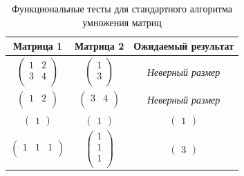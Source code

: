 \begin{table}[h!]
    \caption{Функциональные тесты для стандартного алгоритма умножения матриц}
    \label{tbl:func_test_std}
    \centering
        \begin{tabular}{||c|c|c||} 
        \hline
        Матрица 1& Матрица 2& Ожидаемый результат \\
        \hline\hline
        $\begin{pmatrix}
            1 & 2\\
            3 & 4\\
        \end{pmatrix}$ 
        &  
        $\begin{pmatrix}
            1 \\
            3 \\
        \end{pmatrix}$
        &
        \textit{Неверный размер} \\
        \hline
        $\begin{pmatrix}
            1 & 2\\
        \end{pmatrix}$ 
        &  
        $\begin{pmatrix}
            3 & 4\\
        \end{pmatrix}$
        &
        \textit{Неверный размер} \\
        \hline
        $\begin{pmatrix}
            1
        \end{pmatrix}$ 
        &  
        $\begin{pmatrix}
            1
        \end{pmatrix}$
        &
        $\begin{pmatrix}
            1
        \end{pmatrix}$ \\
        \hline
        $\begin{pmatrix}
            1 & 1 & 1\\
        \end{pmatrix}$ 
        &  
        $\begin{pmatrix}
            1\\
            1\\
            1\\
        \end{pmatrix}$
        &
        $\begin{pmatrix}
            3
        \end{pmatrix}$ \\

\end{tabular}
\end{table}

